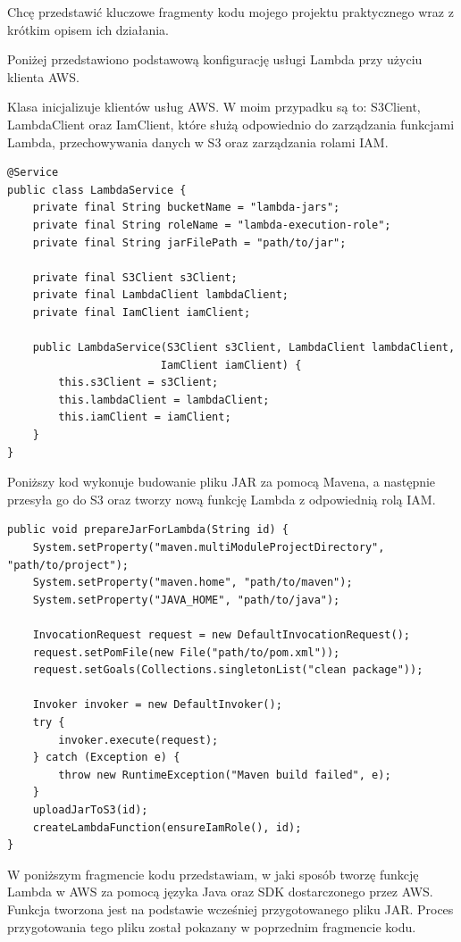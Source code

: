 \documentclass[runningheads,12pt]{llncs}
\begin{document}
Chcę przedstawić kluczowe fragmenty kodu mojego projektu praktycznego wraz z krótkim opisem ich działania.

Poniżej przedstawiono podstawową konfigurację usługi Lambda przy użyciu klienta AWS.

Klasa inicjalizuje klientów usług AWS. W moim przypadku są to: S3Client, LambdaClient oraz IamClient, które służą odpowiednio do zarządzania funkcjami Lambda, przechowywania danych w S3 oraz zarządzania rolami IAM.

\begin{verbatim}
@Service
public class LambdaService {
    private final String bucketName = "lambda-jars";
    private final String roleName = "lambda-execution-role";
    private final String jarFilePath = "path/to/jar";

    private final S3Client s3Client;
    private final LambdaClient lambdaClient;
    private final IamClient iamClient;

    public LambdaService(S3Client s3Client, LambdaClient lambdaClient,
                        IamClient iamClient) {
        this.s3Client = s3Client;
        this.lambdaClient = lambdaClient;
        this.iamClient = iamClient;
    }
}
\end{verbatim}

Poniższy kod wykonuje budowanie pliku JAR za pomocą Mavena, a następnie przesyła go do S3 oraz tworzy nową funkcję Lambda z odpowiednią rolą IAM.

\begin{verbatim}
public void prepareJarForLambda(String id) {
    System.setProperty("maven.multiModuleProjectDirectory", "path/to/project");
    System.setProperty("maven.home", "path/to/maven");
    System.setProperty("JAVA_HOME", "path/to/java");

    InvocationRequest request = new DefaultInvocationRequest();
    request.setPomFile(new File("path/to/pom.xml"));
    request.setGoals(Collections.singletonList("clean package"));

    Invoker invoker = new DefaultInvoker();
    try {
        invoker.execute(request);
    } catch (Exception e) {
        throw new RuntimeException("Maven build failed", e);
    }
    uploadJarToS3(id);
    createLambdaFunction(ensureIamRole(), id);
}
\end{verbatim}

W poniższym fragmencie kodu przedstawiam, w jaki sposób tworzę funkcję Lambda w AWS za pomocą języka Java oraz SDK dostarczonego przez AWS. Funkcja tworzona jest na podstawie wcześniej przygotowanego pliku JAR. Proces przygotowania tego pliku został pokazany w poprzednim fragmencie kodu.
\end{document}
